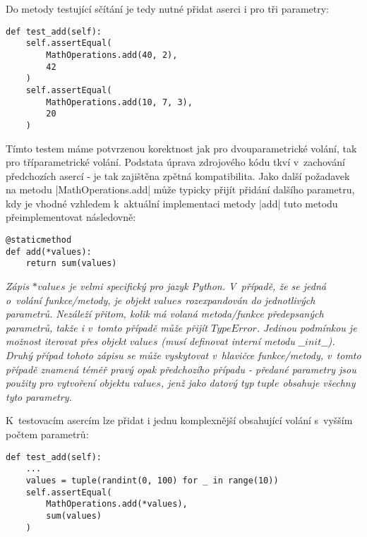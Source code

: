 Do metody testující sčítání je tedy nutné přidat aserci i pro tři parametry:

\begin{lstlisting}[caption={Testovací metoda pro vylepšenou $MathOperations.add$}]
def test_add(self):
	self.assertEqual(
		MathOperations.add(40, 2),
		42
	)
	self.assertEqual(
		MathOperations.add(10, 7, 3),
		20
	)
\end{lstlisting}

\begin{sloppypar}
	Tímto testem máme potvrzenou korektnost jak pro dvouparametrické volání, tak pro  tříparametrické volání. Podstata úprava zdrojového kódu tkví v~zachování předchozích asercí - je tak zajištěna zpětná kompatibilita. Jako další požadavek na metodu \ic|MathOperations.add| může typicky přijít přidání dalšího parametru, kdy je vhodné vzhledem k~aktuální implementaci metody \ic|add| tuto metodu přeimplementovat následovně:
\end{sloppypar}

\begin{lstlisting}[caption={Finální implementace metody $MathOperations.add$}]
@staticmethod
def add(*values):
	return sum(values)
\end{lstlisting}

\textit{
  Zápis $*values$ je velmi specifický pro jazyk Python. V~případě, že se jedná o~volání funkce/metody, je objekt $values$ rozexpandován do jednotlivých parametrů. Nezáleží přitom, kolik má volaná metoda/funkce předepsaných parametrů, takže i v~tomto případě může přijít $TypeError$. Jedinou podmínkou je možnost iterovat přes objekt $values$ (musí definovat interní metodu $\_\_init\_\_$). \\Druhý případ tohoto zápisu se může vyskytovat v~hlavičce funkce/metody, v~tomto případě znamená téměř pravý opak předchozího případu - předané parametry jsou použity pro vytvoření objektu $values$, jenž jako datový typ $tuple$ obsahuje všechny tyto parametry. 
}

K~testovacím asercím lze přidat i jednu komplexnější obsahující volání s~vyšším počtem parametrů:

\begin{lstlisting}[caption={Finální test pro metodu $MathOperations.add$}]
def test_add(self):
	...
	values = tuple(randint(0, 100) for _ in range(10))
	self.assertEqual(
		MathOperations.add(*values),
		sum(values)
	)

\end{lstlisting}

